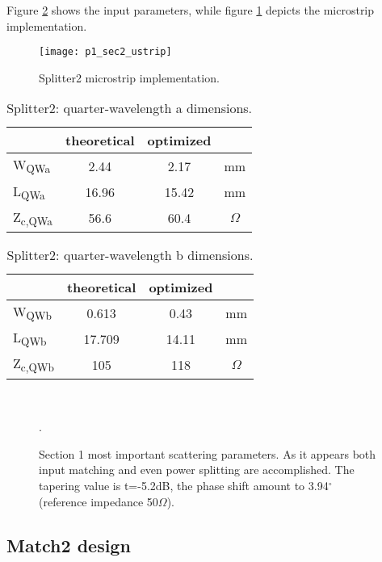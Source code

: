 Figure \ref{fig:p2_sec1Scatt} shows the input parameters, while figure \ref{fig:p1_sec2_ustrip} depicts the microstrip implementation.
\begin{figure}[t] 
	\centering
	\texttt{[image: p1\_sec2\_ustrip]}
	\caption{Splitter2 microstrip implementation. }
	\label{fig:p1_sec2_ustrip}
\end{figure}
\newpage
\begin{table} [h]
	\label{tab:p2_sec2DimQWa}
	\caption{Splitter2: quarter-wavelength a dimensions.}
	\centering	
	\begin{tabular}{lccc} 
		\toprule
		& theoretical & optimized &\\
		\midrule 
		W\textsubscript{QWa} 	&	2.44		&	2.17& mm		\\
		L\textsubscript{QWa}	&	16.96		& 	15.42& mm		\\ 
		Z\textsubscript{c,QWa}	&	56.6		& 	60.4& $\Omega$		\\
		\bottomrule
	\end{tabular}	
\end{table}

\begin{table} [h]
	\label{tab:p2sec2DimQWb}
	\caption{Splitter2: quarter-wavelength b dimensions.}
	\centering	
	\begin{tabular}{lccc} 
		\toprule
		& theoretical & optimized &\\
		\midrule 
		W\textsubscript{QWb} 	&	0.613		&0.43& mm		\\
		L\textsubscript{QWb}	&	17.709		& 14.11& mm		\\ 
		Z\textsubscript{c,QWb}	&	105			& 118& $\Omega$		\\
		\bottomrule
	\end{tabular}	
\end{table}

\newpage

\begin{figure}[H] 
	\centering
	\quad
	\\
	\caption{Section 1 most important scattering parameters. As it appears both input matching and even power splitting are accomplished. The tapering value is t=-5.2dB, the phase shift amount to 3.94$^\circ$ (reference impedance 50$\Omega$).}.
	\label{fig:p2_sec1Scatt}
\end{figure}
\newpage
\subsection{Match2 design}

